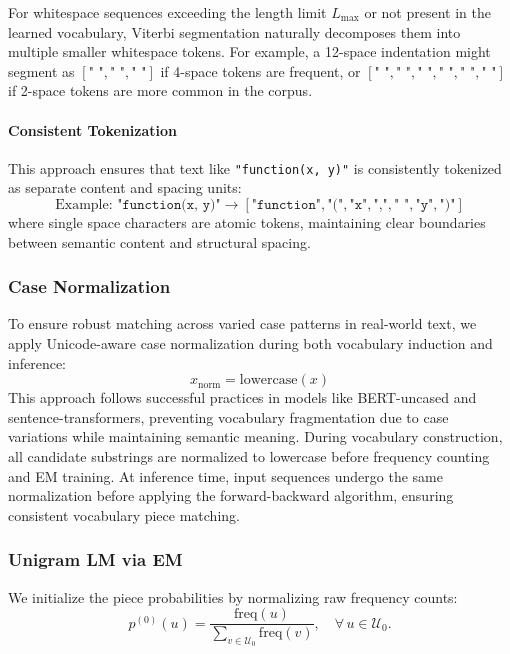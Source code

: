 For whitespace sequences exceeding the length limit $L_{\max}$ or not present in the learned vocabulary, Viterbi segmentation naturally decomposes them into multiple smaller whitespace tokens. For example, a 12-space indentation might segment as $[\texttt{"    "}, \texttt{"    "}, \texttt{"    "}]$ if 4-space tokens are frequent, or $[\texttt{"  "}, \texttt{"  "}, \texttt{"  "}, \texttt{"  "}, \texttt{"  "}, \texttt{"  "}]$ if 2-space tokens are more common in the corpus.

\paragraph{Consistent Tokenization}

This approach ensures that text like \texttt{"function(x, y)"} is consistently tokenized as separate content and spacing units:
\[
\text{Example: } \texttt{"function(x,\ y)"} \rightarrow [\texttt{"function"}, \texttt{"("}, \texttt{"x"}, \texttt{","}, \texttt{" "}, \texttt{"y"}, \texttt{")"}]
\]
where single space characters are atomic tokens, maintaining clear boundaries between semantic content and structural spacing.

\subsubsection{Case Normalization}

To ensure robust matching across varied case patterns in real-world text, we apply Unicode-aware case normalization during both vocabulary induction and inference:
\[
x_{\text{norm}} = \text{lowercase}(x)
\]
This approach follows successful practices in models like BERT-uncased and sentence-transformers, preventing vocabulary fragmentation due to case variations while maintaining semantic meaning. During vocabulary construction, all candidate substrings are normalized to lowercase before frequency counting and EM training. At inference time, input sequences undergo the same normalization before applying the forward-backward algorithm, ensuring consistent vocabulary piece matching.

\subsubsection{Unigram LM via EM}

We initialize the piece probabilities by normalizing raw frequency counts:
\[
p^{(0)}(u)
= \frac{\mathrm{freq}(u)}{\sum_{v\in\mathcal U_{0}}\mathrm{freq}(v)},
\quad
\forall\,u\in\mathcal U_{0}.
\]

